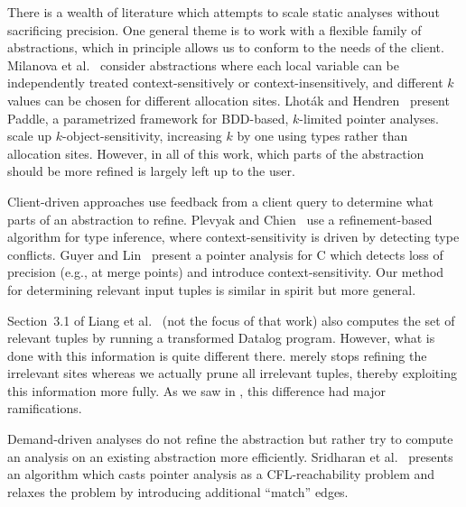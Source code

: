 
There is a wealth of literature which attempts to scale static analyses without
sacrificing precision.  One general theme is to work with a flexible family of
abstractions, which in principle allows us to conform to the needs of the
client.  Milanova et al.~\cite{kobj,MilanovaRountevRyder2005} consider
abstractions where each local variable can be independently treated
context-sensitively or context-insensitively, and different $k$ values can be
chosen for different allocation sites.  Lhot\'{a}k and
Hendren~\cite{LhotakHendren2006,LhotakHendren2008} present Paddle, a
parametrized framework for BDD-based, $k$-limited pointer analyses.
\cite{smaragdakis11context} scale up $k$-object-sensitivity, increasing $k$ by one
using types rather than allocation sites.  However, in all of this work, which parts of the
abstraction should be more refined is largely left up to the user.

Client-driven approaches use feedback from a client query to determine what
parts of an abstraction to refine.
Plevyak and Chien~\cite{PlevyakChien1994} use a refinement-based algorithm for
type inference, where context-sensitivity is driven by detecting type conflicts.
Guyer and Lin~\cite{GuyerLin2003} present a pointer analysis for C
which detects loss of precision (e.g., at merge points) and introduce context-sensitivity.
Our method for determining relevant input tuples is similar in spirit but more general.

Section~3.1 of Liang et al.~\cite{liang11minimal} (not the focus of that work)
also computes the set of relevant tuples by running a transformed Datalog program.  However, what
is done with this information is quite different there.  \cite{liang11minimal} merely
stops refining the irrelevant sites whereas we actually prune all irrelevant
tuples, thereby exploiting this information more fully.  As we saw in
, this difference had major ramifications.


Demand-driven analyses \cite{HeintzeTardieu2001,ZhengRugina2008} do not refine
the abstraction but rather try to compute an analysis on an existing
abstraction more efficiently.
Sridharan et al.~\cite{SridharanBodik2006} presents an algorithm
which casts pointer analysis as a CFL-reachability problem and relaxes the problem by
introducing additional ``match'' edges.

